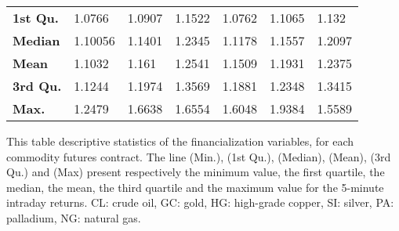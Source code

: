 \begin{landscape}
\begin{table}[]
\begin{center}
\begin{tabular}{@{}lllllll@{}}
\textbf{1st Qu.} & 1.0766    & 1.0907    & 1.1522    & 1.0762    & 1.1065    & 1.132    \\
\textbf{Median}  & 1.10056    & 1.1401    & 1.2345    & 1.1178    & 1.1557    & 1.2097    \\
\textbf{Mean}    & 1.1032    & 1.161    & 1.2541    & 1.1509    & 1.1931    & 1.2375    \\
\textbf{3rd Qu.} & 1.1244    & 1.1974    & 1.3569    & 1.1881    & 1.2348    & 1.3415    \\
\textbf{Max.}    & 1.2479    & 1.6638    & 1.6554    & 1.6048    & 1.9384    & 1.5589    \\ \bottomrule
\end{tabular}
\end{center}
\begin{tablenotes}\item 
        \singlespacing
        \footnotesize
This table descriptive statistics of the financialization variables, for each commodity futures contract. The line (Min.), (1st Qu.), (Median), (Mean), (3rd Qu.) and (Max) present respectively the minimum value, the first quartile, the median, the mean, the third quartile and the maximum value for the 5-minute intraday returns. CL: crude oil, GC: gold, HG: high-grade copper, SI: silver, PA: palladium, NG: natural gas.
\end{tablenotes}
\end{table}

\end{landscape}


